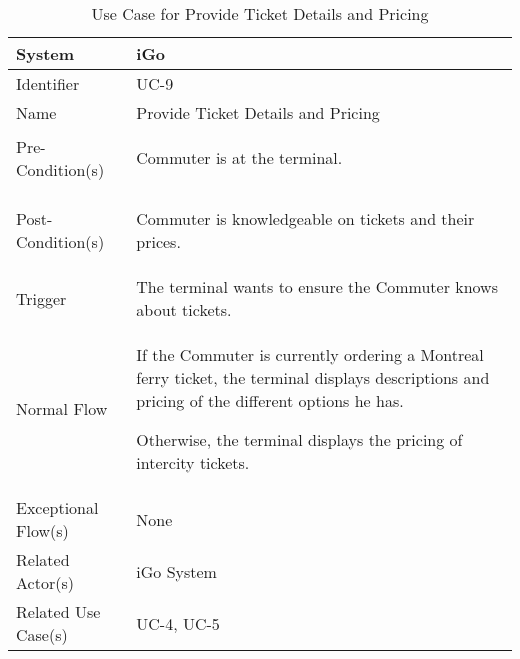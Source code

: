 \begin{table}[ht]
    \centering
    \begin{tabular}{|l|p{11cm}|}
        \hline
        System             & iGo\\
        \hline
        Identifier         & UC-9 \\
        \hline
        Name               & Provide Ticket Details and Pricing \\
        \hline
        Pre-Condition(s)   & 
        \begin{enumerate*}[itemjoin=\newline]
            \item Commuter is at the terminal.
        \end{enumerate*} \\
        \hline
        Post-Condition(s)  & 
        \begin{enumerate*}[itemjoin=\newline]
            \item Commuter is knowledgeable on tickets and their prices.
        \end{enumerate*} \\
        \hline
        Trigger            & The terminal wants to ensure the Commuter knows about tickets. \\
        \hline
        Normal Flow        & 
        \begin{enumerate*}[itemjoin=\newline]
            \item If the Commuter is currently ordering a Montreal ferry ticket, the terminal displays descriptions and pricing of the different options he has.
            \item Otherwise, the terminal displays the pricing of intercity tickets.
        \end{enumerate*} \\
        \hline
        Exceptional Flow(s)& None\\
        \hline
        Related Actor(s)   & iGo System \\
        \hline
        Related Use Case(s)& UC-4, UC-5\\
        \hline
    \end{tabular}
    \caption{Use Case for Provide Ticket Details and Pricing}
    \label{tab:UC_ProvideTicketDetailsAndPricing}
\end{table}


